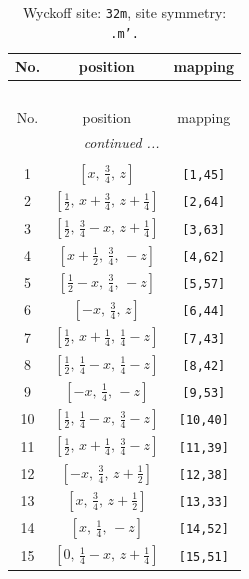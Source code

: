 \documentclass[fleqn,8pt]{jsarticle}
\begin{document}
\begin{longtable}{ccc}
\caption{Wyckoff site: {\tt 32m}, site symmetry: {\tt .m'.}}
 \\
 \hline \hline
No. & position & mapping \\ \hline \endfirsthead

\multicolumn{2}{l}{\tablename\ \thetable{}} \\
 \hline \hline
No. & position & mapping \\ \hline \endhead

 \hline \hline
\multicolumn{2}{r}{\footnotesize\it continued ...} \\ \endfoot

 \hline \hline
\multicolumn{2}{r}{} \\ \endlastfoot

1 & $\left[ x,\, \frac{3}{4},\, z \right]$ & {\tt [1,45]} \\ \hline
2 & $\left[ \frac{1}{2},\, x + \frac{3}{4},\, z + \frac{1}{4} \right]$ & {\tt [2,64]} \\ \hline
3 & $\left[ \frac{1}{2},\, \frac{3}{4} - x,\, z + \frac{1}{4} \right]$ & {\tt [3,63]} \\ \hline
4 & $\left[ x + \frac{1}{2},\, \frac{3}{4},\, - z \right]$ & {\tt [4,62]} \\ \hline
5 & $\left[ \frac{1}{2} - x,\, \frac{3}{4},\, - z \right]$ & {\tt [5,57]} \\ \hline
6 & $\left[ - x,\, \frac{3}{4},\, z \right]$ & {\tt [6,44]} \\ \hline
7 & $\left[ \frac{1}{2},\, x + \frac{1}{4},\, \frac{1}{4} - z \right]$ & {\tt [7,43]} \\ \hline
8 & $\left[ \frac{1}{2},\, \frac{1}{4} - x,\, \frac{1}{4} - z \right]$ & {\tt [8,42]} \\ \hline
9 & $\left[ - x,\, \frac{1}{4},\, - z \right]$ & {\tt [9,53]} \\ \hline
10 & $\left[ \frac{1}{2},\, \frac{1}{4} - x,\, \frac{3}{4} - z \right]$ & {\tt [10,40]} \\ \hline
11 & $\left[ \frac{1}{2},\, x + \frac{1}{4},\, \frac{3}{4} - z \right]$ & {\tt [11,39]} \\ \hline
12 & $\left[ - x,\, \frac{3}{4},\, z + \frac{1}{2} \right]$ & {\tt [12,38]} \\ \hline
13 & $\left[ x,\, \frac{3}{4},\, z + \frac{1}{2} \right]$ & {\tt [13,33]} \\ \hline
14 & $\left[ x,\, \frac{1}{4},\, - z \right]$ & {\tt [14,52]} \\ \hline
15 & $\left[ 0,\, \frac{1}{4} - x,\, z + \frac{1}{4} \right]$ & {\tt [15,51]} \\ \hline

\end{longtable}
\end{document}
